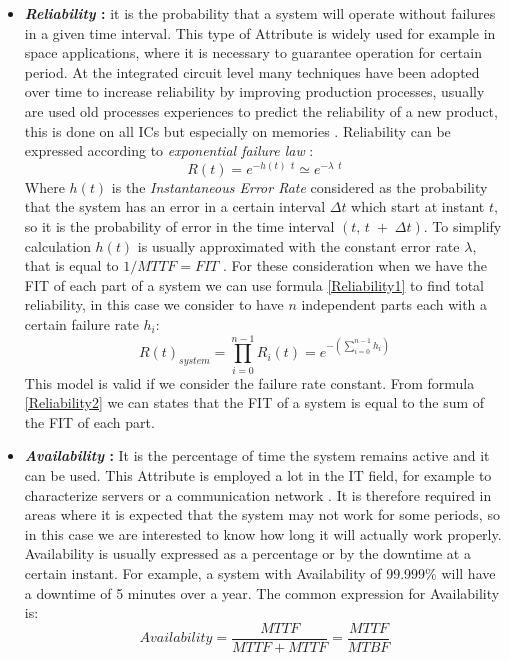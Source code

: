 {{{{\begin{itemize}
					\item \textbf{\textit{Reliability} : } it is the probability that a system will operate without failures in a given time interval. This type of Attribute is widely used for example in space applications, where it is necessary to guarantee operation for certain period.  At the integrated circuit level many techniques have been adopted over time to increase reliability by improving production processes, usually are used old processes experiences to predict the reliability of a new product, this is done on all ICs but especially on memories \cite{An_Extended_Building-In_Reliability_Methodology_on_Evaluating_SRAM}. Reliability can be expressed according to \textit{exponential failure law} :
					\begin{equation} \label{Reliability1}
						R(t)= e^{-h(t) \:\: t} \simeq e^{-\lambda \:\: t} 
					\end{equation} 
					Where $h(t)$ is the \textit{Instantaneous Error Rate} considered as the probability that the system has an error in a certain interval $\Delta t$ which start at instant $t$, so it is the probability of error in the time interval $(t,\, t\;+\;\Delta t )$. To simplify calculation $h(t)$ is usually approximated with the constant error rate $\lambda$, that is equal to $1/MTTF = FIT$ \cite{Mukherjee2008}.
					For these consideration when we have the FIT of each part of a system we can use formula \ref{Reliability1} to find total reliability, in this  case we consider to have $n$ independent parts each with a certain failure rate $h_i$:
					\begin{equation} \label{Reliability2}
						R(t)_{system} = \prod_{i=0}^{n-1}R_i(t) = e^{-\left(\sum_{i=0}^{n-1}h_i\right)}
					\end{equation}
					This model is valid if we consider the failure rate constant. From formula \ref{Reliability2}  we can states that the FIT of a system is equal to the sum of the FIT of each part.
					
					\item \textbf{\textit{Availability} : } It is the percentage of time the system remains active and it can be used. This Attribute is employed a lot in the IT field, for example to characterize servers or a communication network  \cite{Availability_requirement_for_a_fault-management_server_in_high-availability_communication_system} \cite{Guaranteeing_High_Availability_to_Client-Server_Communications}. It is therefore required in areas where it is expected that the system may not work for some periods, so in this case we are interested to know how long it will actually work properly. Availability is usually expressed as a percentage or by the downtime at a certain instant. For example, a system with Availability of 99.999\% will have a downtime of 5 minutes over a year. The common expression for Availability is:
					\begin{equation}
						Availability = \dfrac{MTTF}{MTTF + MTTF} = \frac{MTTF}{MTBF} 
					\end{equation}
					

\end{itemize}}}}}
